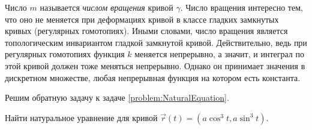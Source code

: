 Число $m$ называется \textit{числом вращения} кривой $\gamma$. Число вращения интересно тем, что оно не меняется при деформациях кривой в классе гладких замкнутых кривых (регулярных гомотопиях). Иными словами, число вращения является топологическим инвариантом гладкой замкнутой кривой. Действительно, ведь при регулярных гомотопиях функция $k$ меняется непрерывно, а значит, и интеграл по этой кривой должен тоже меняться непрерывно. Однако он принимает значения в дискретном множестве, любая непрерывная функция на котором есть константа.

%

Решим обратную задачу к задаче \ref{problem:NaturalEquation}.

\begin{problem}
	Найти натуральное уравнение для кривой $\vec{r}(t) = (a\cos^3t, a\sin^3t)$.
\end{problem}

